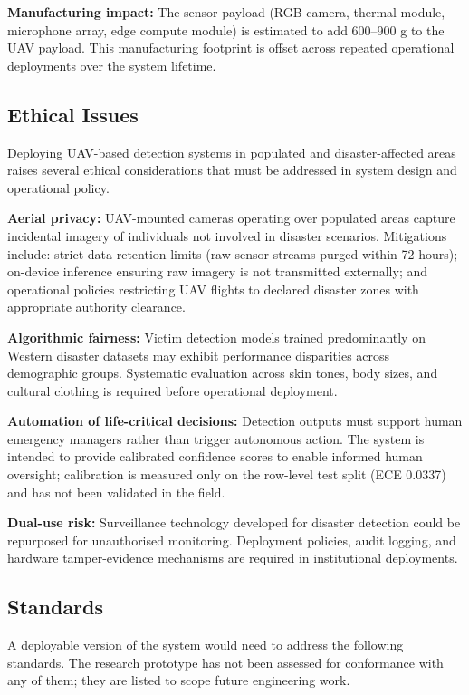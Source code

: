 \documentclass[journal]{IEEEtran}
\begin{document}
\textbf{Manufacturing impact:} The sensor payload (RGB camera, thermal module, microphone array, edge compute module) is estimated to add 600--900 g to the UAV payload. This manufacturing footprint is offset across repeated operational deployments over the system lifetime.

\subsection{Ethical Issues}

Deploying UAV-based detection systems in populated and disaster-affected areas raises several ethical considerations that must be addressed in system design and operational policy.

\textbf{Aerial privacy:} UAV-mounted cameras operating over populated areas capture incidental imagery of individuals not involved in disaster scenarios. Mitigations include: strict data retention limits (raw sensor streams purged within 72 hours); on-device inference ensuring raw imagery is not transmitted externally; and operational policies restricting UAV flights to declared disaster zones with appropriate authority clearance.

\textbf{Algorithmic fairness:} Victim detection models trained predominantly on Western disaster datasets may exhibit performance disparities across demographic groups. Systematic evaluation across skin tones, body sizes, and cultural clothing is required before operational deployment.

\textbf{Automation of life-critical decisions:} Detection outputs must support human emergency managers rather than trigger autonomous action. The system is intended to provide calibrated confidence scores to enable informed human oversight; calibration is measured only on the row-level test split (ECE 0.0337) and has not been validated in the field.

\textbf{Dual-use risk:} Surveillance technology developed for disaster detection could be repurposed for unauthorised monitoring. Deployment policies, audit logging, and hardware tamper-evidence mechanisms are required in institutional deployments.

\subsection{Standards}

A deployable version of the system would need to address the following standards. The research prototype has not been assessed for conformance with any of them; they are listed to scope future engineering work.
\end{document}
